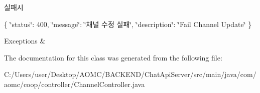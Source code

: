 실패시

\{ \char`\"{}status\char`\"{}\+: 400, \char`\"{}message\char`\"{}\+: \char`\"{}채널 수정 실패\char`\"{}, \char`\"{}description\char`\"{}\+: \char`\"{}\+Fail Channel Update\char`\"{} \}


\begin{DoxyExceptions}{Exceptions}
{\em } & \\
\hline
\end{DoxyExceptions}


The documentation for this class was generated from the following file\+:\begin{DoxyCompactItemize}
\item 
C\+:/\+Users/user/\+Desktop/\+A\+O\+M\+C/\+B\+A\+C\+K\+E\+N\+D/\+Chat\+Api\+Server/src/main/java/com/aomc/coop/controller/Channel\+Controller.\+java\end{DoxyCompactItemize}
